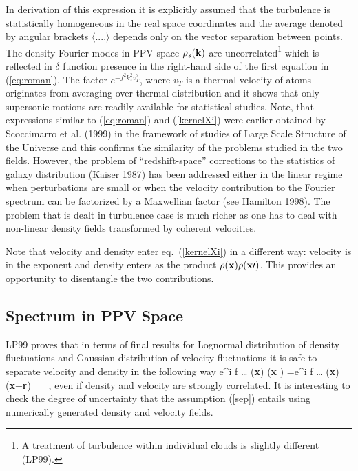 \label{kernelXi}
\ee
In derivation of this expression it is explicitly assumed that the
turbulence is statistically homogeneous in the real space coordinates
and the average denoted by angular brackets $\langle....\rangle$
depends only on the vector separation between points. The density Fourier
modes in PPV space $\rho_s({\bf k})$ are uncorrelated\footnote{A treatment
of turbulence within individual clouds is slightly different (LP99).} 
which is reflected
in $\delta$ function presence in the right-hand side of the first equation
in (\ref{eq:roman}). The factor $ e^{-f^2 k_z^2 v_T^2}$, where $v_T$
is a thermal velocity of atoms originates from averaging over thermal
distribution and it shows that only supersonic motions are readily 
available for statistical studies. Note, that
expressions similar to (\ref{eq:roman})
and (\ref{kernelXi}) were earlier obtained by Scoccimarro et al. (1999)
in the framework of studies of Large Scale Structure of the Universe
and this confirms the similarity of the problems studied in the two fields.
However, the problem of ``redshift-space'' corrections to the statistics
of galaxy distribution (Kaiser 1987)
has been addressed either in the linear regime
when perturbations are small  or when the velocity contribution to the
Fourier spectrum can be factorized by a Maxwellian factor (see Hamilton 1998).
The problem that is dealt in turbulence case is much richer as one
has to deal with non-linear density fields transformed by coherent velocities.

Note that velocity and density enter eq.~(\ref{kernelXi}) in a different
way: velocity is in the exponent and density enters as the product
$\rho ({\bf x}) \rho ({\bf x \prime})$. This provides an opportunity
to disentangle the two contributions.

\subsection{Spectrum in PPV Space}

LP99 proves that in terms of final results
for Lognormal distribution of density fluctuations
and Gaussian distribution of velocity fluctuations it is safe to
separate velocity and density in the following way
\be
\langle e^{i f \ldots} \rho ({\bf x}) \rho ({\bf x \prime}) \rangle =\langle e^{i f \ldots} \rangle \langle \rho ({\bf x}) \rho ({\bf x}+{\bf r}) \rangle~~~,
\label{sep} 
\ee
even if density and velocity are strongly correlated. 
It is interesting to check the degree of uncertainty that
 the assumption (\ref{sep}) entails using numerically generated density
and velocity fields. 

